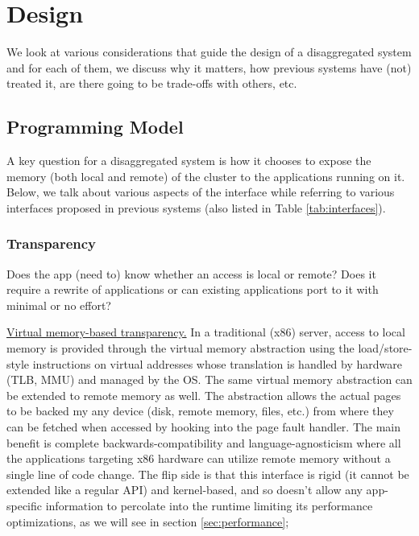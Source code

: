 
\section{Design}
\label{sec:design}
We look at various considerations that guide the design of a 
disaggregated system and for each of them, we discuss why it 
matters, how previous systems have (not) treated it, are there 
going to be trade-offs with others, etc. 

\subsection{Programming Model}
A key question for a disaggregated system is how it 
chooses to expose the memory (both local and remote) of the 
cluster to the applications running on it. Below, we talk about 
various aspects of the interface while referring to 
various interfaces proposed in previous systems 
(also listed in Table \ref{tab:interfaces}).

\subsubsection{Transparency}
Does the app (need to) know whether an access is local or 
remote? Does it require a rewrite of applications or can 
existing applications port to it with minimal or no effort?

\vspace{3pt}
\noindent \uline{Virtual memory-based transparency.}
In a traditional (x86) server, access to local memory is 
provided through the virtual memory abstraction using 
the load/store-style instructions on virtual addresses 
whose translation is handled by hardware (TLB, MMU) and 
managed by the OS. The same virtual memory abstraction can 
be extended to remote memory as well. The abstraction 
allows the actual pages to be backed my any device 
(disk, remote memory, files, etc.) from where they can 
be fetched when accessed by hooking into the page fault 
handler. The main benefit is complete backwards-compatibility 
and language-agnosticism where all the applications 
targeting x86 hardware can utilize  
remote memory without a single line of code change. The flip side 
is that this interface is rigid (it cannot be extended like a
regular API) and kernel-based, and so doesn't allow any 
app-specific information to percolate into the runtime limiting
its performance optimizations, as we will see in 
section \ref{sec:performance};

